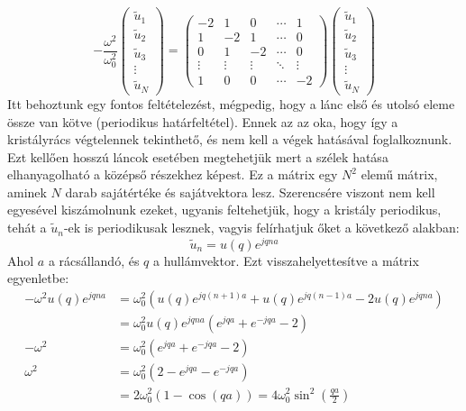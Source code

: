 \documentclass[../main.tex]{subfiles}
\begin{document}
\begin{equation}
    -\frac{\omega^2}{\omega_0^2}
    \begin{pmatrix}
        \tilde{u}_1 \\
        \tilde{u}_2 \\
        \tilde{u}_3 \\
        \vdots \\
        \tilde{u}_N
    \end{pmatrix} =
    \begin{pmatrix}
        -2 & 1 & 0 & \cdots & 1 \\
        1 & -2 & 1 & \cdots & 0 \\
        0 & 1 & -2 & \cdots & 0 \\
        \vdots & \vdots & \vdots & \ddots & \vdots \\
        1 & 0 & 0 & \cdots & -2
    \end{pmatrix}
    \begin{pmatrix}
        \tilde{u}_1 \\
        \tilde{u}_2 \\
        \tilde{u}_3 \\
        \vdots \\
        \tilde{u}_N
    \end{pmatrix}
\end{equation}
Itt behoztunk egy fontos feltételezést, mégpedig, hogy a lánc első és utolsó eleme össze van kötve (periodikus határfeltétel). Ennek az az oka, hogy így a kristályrács végtelennek tekinthető, és nem kell a végek hatásával foglalkoznunk.
Ezt kellően hosszú láncok esetében megtehetjük mert a szélek hatása elhanyagolható a középső részekhez képest. Ez a mátrix egy $N^2$ elemű mátrix, aminek $N$ darab sajátértéke és sajátvektora lesz. Szerencsére viszont nem kell egyesével kiszámolnunk ezeket,
ugyanis feltehetjük, hogy a kristály periodikus, tehát a $\tilde{u}_n$-ek is periodikusak lesznek, vagyis felírhatjuk őket a következő alakban:
\begin{equation}
    \tilde{u}_n = u(q) e^{j q n a}
\end{equation}
Ahol $a$ a rácsállandó, és $q$ a hullámvektor. Ezt visszahelyettesítve a mátrix egyenletbe:
\begin{equation}
    \begin{aligned}
        -\omega^2 u(q) e^{j q n a} &= \omega_0^2 \left( u(q) e^{j q (n+1) a} + u(q) e^{j q (n-1) a} - 2 u(q) e^{j q n a} \right) \\
        &= \omega_0^2 u(q) e^{j q n a} \left( e^{j q a} + e^{-j q a} - 2 \right) \\
        - \omega^2 &= \omega_0^2 \left(e^{j q a} + e^{-j q a} - 2\right) \\
        \omega^2 &= \omega_0^2 \left(2 - e^{j q a} - e^{-j q a}\right) \\
        &= 2 \omega_0^2 \left(1 - \cos(q a)\right) = 4 \omega_0^2 \sin^2\left(\frac{q a}{2}\right)
    \end{aligned}
\end{equation}
\end{document}
